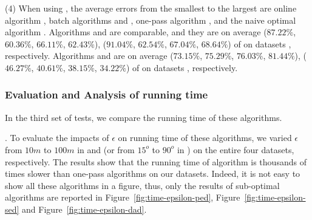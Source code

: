 \sstab (4) When using \sed, the average errors from the smallest
to the largest are online algorithm \squishe, batch algorithms \tpa and \dpa,
one-pass algorithm \cised, and the naive optimal algorithm \opt.
Algorithms \tpa and \dpa are comparable, and they are on average
{($87.22\%$, $60.36\%$, $66.11\%$, $62.43\%$), ($91.04\%$, $62.54\%$, $67.04\%$, $68.64\%$)} of \opt on datasets \dSets, respectively.
Algorithms \cised and \squishe are on average {($73.15\%$, $75.29\%$, $76.03\%$, $81.44\%$), ($46.27\%$, $40.61\%$, $38.15\%$, $34.22\%$)} of \opt on datasets \dSets, respectively.





\vspace{-1ex}
\subsubsection{Evaluation and Analysis of running time}

In the third set of tests, we compare the running time of these algorithms.


.
To evaluate the impacts of $\epsilon$ on running time of these algorithms, we varied $\epsilon$ from $10m$ to $100m$ in \ped and \sed (or from $15^o$ to $90^o$ in \dad) on the entire four datasets, respectively.
%
%
The results show that the running time of algorithm \opt is thousands of times slower than one-pass algorithms on our datasets.
Indeed, it is not easy to show all these algorithms in a figure, thus, only the results of sub-optimal algorithms are reported in Figure~\ref{fig:time-epsilon-ped}, Figure~\ref{fig:time-epsilon-sed} and Figure~\ref{fig:time-epsilon-dad}.

